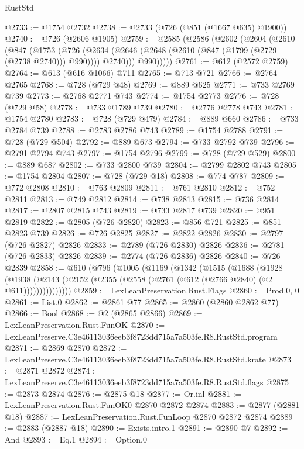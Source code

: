 \begin{lexlean}{RustStd}
\begin{coremodule}
@2733 := @1754 @2732
@2738 := @2733 (@726 (@851 (@1667 @635) @1900))
@2740 := @726 (@2606 @1905)
@2759 := @2585
    (@2586
      (@2602
        (@2604
          (@2610
            (@847
              (@1753
                (@726
                  (@2634 (@2646 (@2648 (@2610 (@847 (@1799 (@2729 (@2738 @2740))) @990)))) @2740)))
              @990)))))
@2761 := @612 (@2572 @2759)
@2764 := @613 (@616 @1066) @711
@2765 := @713 @721
@2766 := @2764 @2765
@2768 := @728 (@729 @48)
@2769 := @889 @625
@2771 := @733 @2769 @739
@2773 := @2768 @2771 @743
@2774 := @1754 @2773
@2776 := @728 (@729 @58)
@2778 := @733 @1789 @739
@2780 := @2776 @2778 @743
@2781 := @1754 @2780
@2783 := @728 (@729 @479)
@2784 := @889 @660
@2786 := @733 @2784 @739
@2788 := @2783 @2786 @743
@2789 := @1754 @2788
@2791 := @728 (@729 @504)
@2792 := @889 @673
@2794 := @733 @2792 @739
@2796 := @2791 @2794 @743
@2797 := @1754 @2796
@2799 := @728 (@729 @529)
@2800 := @889 @687
@2802 := @733 @2800 @739
@2804 := @2799 @2802 @743
@2805 := @1754 @2804
@2807 := @728 (@729 @18)
@2808 := @774 @787
@2809 := @772 @2808
@2810 := @763 @2809
@2811 := @761 @2810
@2812 := @752 @2811
@2813 := @749 @2812
@2814 := @738 @2813
@2815 := @736 @2814
@2817 := @2807 @2815 @743
@2819 := @733 @2817 @739
@2820 := @951 @2819
@2822 := @2805 (@726 @2820)
@2823 := @856 @721
@2825 := @851 @2823 @739
@2826 := @726 @2825
@2827 := @2822 @2826
@2830 := @2797 (@726 @2827) @2826
@2833 := @2789 (@726 @2830) @2826
@2836 := @2781 (@726 @2833) @2826
@2839 := @2774 (@726 @2836) @2826
@2840 := @726 @2839
@2858 := @610
    (@796
      (@1005
        (@1169
          (@1342
            (@1515
              (@1688
                (@1928
                  (@1938
                    (@2143 (@2152 (@2355 (@2558 (@2761 (@612 (@2766 @2840) (@2 @611)))))))))))))))
@2859 := LexLeanPreservation.Rust.Flags
@2860 := Prod.{0, 0}
@2861 := List.{0}
@2862 := @2861 @77
@2865 := @2860 (@2860 @2862 @77)
@2866 := Bool
@2868 := @2 (@2865 @2866)
@2869 := LexLeanPreservation.Rust.FunOK
@2870 := LexLeanPreserve.C3e46113036eeb3f8723dd715a7a503fe.R8.RustStd.program
@2871 := @2869 @2870
@2872 := LexLeanPreserve.C3e46113036eeb3f8723dd715a7a503fe.R8.RustStd.krate
@2873 := @2871 @2872
@2874 := LexLeanPreserve.C3e46113036eeb3f8723dd715a7a503fe.R8.RustStd.flags
@2875 := @2873 @2874
@2876 := @2875 @18
@2877 := Or.inl
@2881 := LexLeanPreservation.Rust.FunOK0 @2870 @2872 @2874
@2883 := @2877 (@2881 @18)
@2887 := LexLeanPreservation.Rust.FunLoop @2870 @2872 @2874
@2889 := @2883 (@2887 @18)
@2890 := Exists.intro.{1}
@2891 := @2890 @7
@2892 := And
@2893 := Eq.{1}
@2894 := Option.{0}

\end{coremodule}
\end{lexlean}
